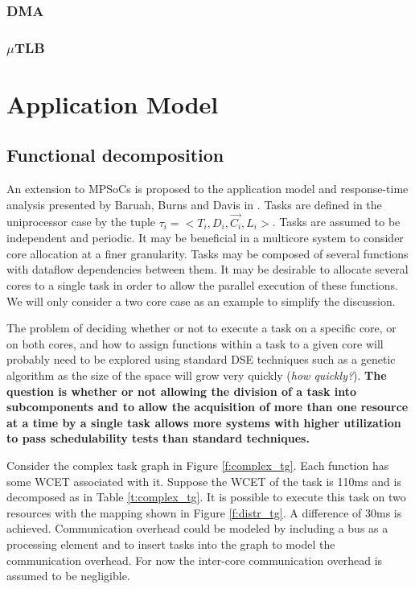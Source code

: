 \documentclass[table,11pt]{article}
\begin{document}
\subsubsection{DMA}

\subsubsection{$\mu$TLB}
 


\section{Application Model}

\subsection{Functional decomposition}
An extension to MPSoCs is proposed to the application model and response-time analysis presented by Baruah, Burns and Davis in \cite{baruah2011response}. Tasks are defined in the uniprocessor case by the tuple $\tau_i= <T_i,D_i,\overrightarrow{C_i},L_i>$. Tasks are assumed to be independent and periodic. It may be beneficial in a multicore system to consider core allocation at a finer granularity. Tasks may be composed of several functions with dataflow dependencies between them. It may be desirable to allocate several cores to a single task in order to allow the parallel execution of these functions. We will only consider a two core case as an example to simplify the discussion.

The problem of deciding whether or not to execute a task on a specific core, or on both cores, and how to assign functions within a task to a given core will probably need to be explored using standard DSE techniques such as a genetic algorithm as the size of the space will grow very quickly (\emph{how quickly?}). \textbf{The question is whether or not allowing the division of a task into subcomponents and to allow the acquisition of more than one resource at a time by a single task allows more systems with higher utilization to pass schedulability tests than standard techniques.}

Consider the complex task graph in Figure \ref{f:complex_tg}. Each function has some WCET associated with it. Suppose the WCET of the task is 110ms and is decomposed as in Table \ref{t:complex_tg}. It is possible to execute this task on two resources with the mapping shown in Figure \ref{f:distr_tg}. A difference of 30ms is achieved. Communication overhead could be modeled by including a bus as a processing element and to insert tasks into the graph to model the communication overhead. For now the inter-core communication overhead is assumed to be negligible.  
 
\end{document}
